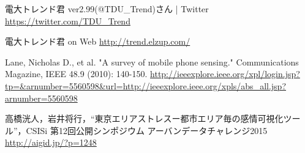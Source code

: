 \begin{thebibliography}{2}
        電大トレンド君 ver2.99(@TDU\_Trend)さん | Twitter
        \url{https://twitter.com/TDU_Trend}

        電大トレンド君 on Web
        \url{http://trend.elzup.com/}

        Lane, Nicholas D., et al. "A survey of mobile phone sensing." Communications Magazine, IEEE 48.9 (2010): 140-150.
        \url{http://ieeexplore.ieee.org/xpl/login.jsp?tp=&arnumber=5560598&url=http://ieeexplore.ieee.org/xpls/abs_all.jsp?arnumber=5560598}

        高橋洸人，岩井将行，“東京エリアストレスー都市エリア毎の感情可視化ツール”，CSISi 第12回公開シンポジウム アーバンデータチャレンジ2015
        \url{http://aigid.jp/?p=1248}

\end{thebibliography}
